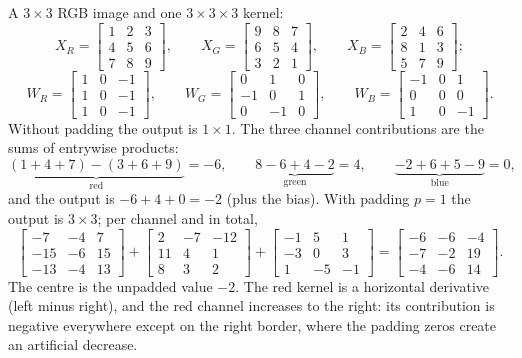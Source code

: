 \begin{notechapter}
\begin{example}\label{convolutional-layers:ex:rgb}
A $3\times3$ RGB image and one $3\times3\times3$ kernel:
\[
  X_R = \begin{bmatrix}1&2&3\\4&5&6\\7&8&9\end{bmatrix},\qquad
  X_G = \begin{bmatrix}9&8&7\\6&5&4\\3&2&1\end{bmatrix},\qquad
  X_B = \begin{bmatrix}2&4&6\\8&1&3\\5&7&9\end{bmatrix};
\]
\[
  W_R = \begin{bmatrix}1&0&-1\\1&0&-1\\1&0&-1\end{bmatrix},\qquad
  W_G = \begin{bmatrix}0&1&0\\-1&0&1\\0&-1&0\end{bmatrix},\qquad
  W_B = \begin{bmatrix}-1&0&1\\0&0&0\\1&0&-1\end{bmatrix}.
\]
Without padding the output is $1\times1$. The three channel contributions are the sums of entrywise
products:
\[
  \underbrace{(1 + 4 + 7) - (3 + 6 + 9)}_{\text{red}} = -6,\qquad
  \underbrace{8 - 6 + 4 - 2}_{\text{green}} = 4,\qquad
  \underbrace{-2 + 6 + 5 - 9}_{\text{blue}} = 0,
\]
and the output is $-6 + 4 + 0 = -2$ (plus the bias). With padding $p = 1$ the output is $3\times3$; per channel
and in total,
\[
  \begin{bmatrix}-7&-4&7\\-15&-6&15\\-13&-4&13\end{bmatrix} + \begin{bmatrix}2&-7&-12\\11&4&1\\8&3&2\end{bmatrix} + \begin{bmatrix}-1&5&1\\-3&0&3\\1&-5&-1\end{bmatrix}
  = \begin{bmatrix}-6&-6&-4\\-7&-2&19\\-4&-6&14\end{bmatrix} .
\]
The centre is the unpadded value $-2$. The red kernel is a horizontal derivative (left minus right),
and the red channel increases to the right: its contribution is negative everywhere except
on the right border, where the padding zeros create an artificial decrease.
\end{example}


\end{notechapter}
